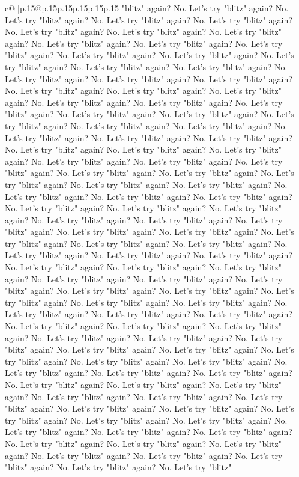 \documentclass{article}
\begin{document}
{\begin{supertabular}{c@{$\;$}|p{.15\linewidth}@{}p{.15\linewidth}p{.15\linewidth}p{.15\linewidth}p{.15\linewidth}p{.15\linewidth}}
{{{"blitz" again? No. Let's try "blitz" again? No. Let's try "blitz" again? No. Let's try "blitz" again? No. Let's try "blitz" again? No. Let's try "blitz" again? No. Let's try "blitz" again? No. Let's try "blitz" again? No. Let's try "blitz" again? No. Let's try "blitz" again? No. Let's try "blitz" again? No. Let's try "blitz" again? No. Let's try "blitz" again? No. Let's try "blitz" again? No. Let's try "blitz" again? No. Let's try "blitz" again? No. Let's try "blitz" again? No. Let's try "blitz" again? No. Let's try "blitz" again? No. Let's try "blitz" again? No. Let's try "blitz" again? No. Let's try "blitz" again? No. Let's try "blitz" again? No. Let's try "blitz" again? No. Let's try "blitz" again? No. Let's try "blitz" again? No. Let's try "blitz" again? No. Let's try "blitz" again? No. Let's try "blitz" again? No. Let's try "blitz" again? No. Let's try "blitz" again? No. Let's try "blitz" again? No. Let's try "blitz" again? No. Let's try "blitz" again? No. Let's try "blitz" again? No. Let's try "blitz" again? No. Let's try "blitz" again? No. Let's try "blitz" again? No. Let's try "blitz" again? No. Let's try "blitz" again? No. Let's try "blitz" again? No. Let's try "blitz" again? No. Let's try "blitz" again? No. Let's try "blitz" again? No. Let's try "blitz" again? No. Let's try "blitz" again? No. Let's try "blitz" again? No. Let's try "blitz" again? No. Let's try "blitz" again? No. Let's try "blitz" again? No. Let's try "blitz" again? No. Let's try "blitz" again? No. Let's try "blitz" again? No. Let's try "blitz" again? No. Let's try "blitz" again? No. Let's try "blitz" again? No. Let's try "blitz" again? No. Let's try "blitz" again? No. Let's try "blitz" again? No. Let's try "blitz" again? No. Let's try "blitz" again? No. Let's try "blitz" again? No. Let's try "blitz" again? No. Let's try "blitz" again? No. Let's try "blitz" again? No. Let's try "blitz" again? No. Let's try "blitz" again? No. Let's try "blitz" again? No. Let's try "blitz" again? No. Let's try "blitz" again? No. Let's try "blitz" again? No. Let's try "blitz" again? No. Let's try "blitz" again? No. Let's try "blitz" again? No. Let's try "blitz" again? No. Let's try "blitz" again? No. Let's try "blitz" again? No. Let's try "blitz" again? No. Let's try "blitz" again? No. Let's try "blitz" again? No. Let's try "blitz" again? No. Let's try "blitz" again? No. Let's try "blitz" again? No. Let's try "blitz" again? No. Let's try "blitz" again? No. Let's try "blitz" again? No. Let's try "blitz" again? No. Let's try "blitz" again? No. Let's try "blitz" again? No. Let's try "blitz" again? No. Let's try "blitz" again? No. Let's try "blitz" again? No. Let's try "blitz" again? No. Let's try "blitz" again? No. Let's try "blitz" again? No. Let's try "blitz" again? No. Let's try "blitz" again? No. Let's try "blitz" again? No. Let's try "blitz" again? No. Let's try "blitz" again? No. Let's try "blitz" again? No. Let's try "blitz" again? No. Let's try "blitz" again? No. Let's try "blitz" again? No. Let's try "blitz" again? No. Let's try "blitz" again? No. Let's try "blitz" again? No. Let's try "blitz" again? No. Let's try "blitz" again? No. Let's try "blitz" again? No. Let's try "blitz" }}}
\end{supertabular}}
\end{document}
